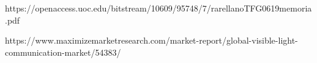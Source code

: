 
https://openaccess.uoc.edu/bitstream/10609/95748/7/rarellanoTFG0619memoria.pdf

https://www.maximizemarketresearch.com/market-report/global-visible-light-communication-market/54383/